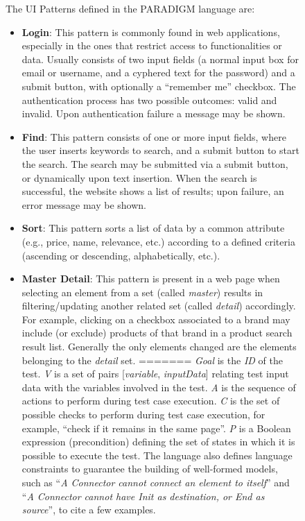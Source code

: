 \documentclass[conference]{IEEEtran}
\begin{document}
\begin{enumerate}
\begin{figure}[!htb]
The UI Patterns defined in the PARADIGM language are:
\begin{itemize}
\item \textbf{Login}: This pattern is commonly found in web applications, especially in the ones that restrict access to functionalities or data. Usually consists of two input fields (a normal input box for email or username, and a cyphered text for the password) and a submit button, with optionally a ``remember me'' checkbox. The authentication process has two possible outcomes: valid and invalid. Upon authentication failure a message may be shown. 
\item \textbf{Find}: This pattern consists of one or more input fields, where the user inserts keywords to search, and a submit button to start the search. The search may be submitted via a submit button, or dynamically upon text insertion. When the search is successful, the website shows a list of results; upon failure, an error message may be shown.
\item \textbf{Sort}: This pattern sorts a list of data by a common attribute (e.g., price, name, relevance, etc.) according to a defined criteria (ascending or descending, alphabetically, etc.).
\item \textbf{Master Detail}: This pattern is present in a web page when selecting an element from a set (called \textit{master}) results in filtering/updating another related set (called \textit{detail}) accordingly. For example, clicking on a checkbox associated to a brand may include (or exclude) products of that brand in a product search result list. Generally the only elements changed are the elements belonging to the \textit{detail} set.
=======
\textit{Goal} is the \textit{ID} of the test. \textit{V} is a set of pairs { [\textit{variable}, \textit{inputData}] } relating test input data with the variables involved in the test. \textit{A} is the sequence of actions to perform during test case execution. \textit{C} is the set of possible checks to perform during test case execution, for example, “check if it remains in the same page”. \textit{P} is a Boolean expression (precondition) defining the set of states in which it is possible to execute the test. The language also defines language constraints to guarantee the building of well-formed models, such as ``\textit{A Connector cannot connect an element to itself}'' and ``\textit{A Connector cannot have Init as destination, or End as source}'', to cite a few examples.\\


\end{itemize}
\end{figure}
\end{enumerate}
\end{document}
